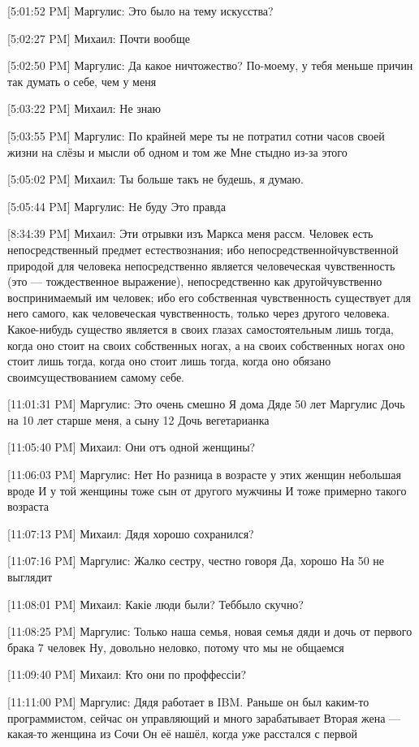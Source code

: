 \documentclass{article}
\newcommand{\yat}{{\fontencoding{X2}\selectfont\cyryat}} %
\begin{document}
[5:01:52 PM] Маргулис:
Это было на тему искусства?

[5:02:27 PM] Михаил:
Почти вообще

[5:02:50 PM] Маргулис:
Да какое ничтожество? По-моему, у тебя меньше причин так думать о себе, чем у меня

[5:03:22 PM] Михаил:
Не знаю

[5:03:55 PM] Маргулис:
По крайней мере ты не потратил сотни часов своей жизни на слёзы и мысли об одном и том же
 Мне стыдно из-за этого

[5:05:02 PM] Михаил:
Ты больше такъ не будешь, я думаю.

[5:05:44 PM] Маргулис:
Не буду
 Это правда

[8:34:39 PM] Михаил:
Эти отрывки изъ Маркса меня рассм.
 Человек есть непосредственный предмет естествознания; ибо непосредственнойчувственной природой для человека непосредственно является человеческая чувственность (это — тождественное выражение), непосредственно как другойчувственно воспринимаемый им человек; ибо его собственная чувственность существует для него самого, как человеческая чувственность, только через другого человека.
 Какое-нибудь существо является в своих глазах самостоятельным лишь тогда, когда оно стоит на своих собственных ногах, а на своих собственных ногах оно стоит лишь тогда, когда оно стоит лишь тогда, когда оно обязано своимсуществованием самому себе.

[11:01:31 PM] Маргулис:
Это очень смешно
 Я дома
 Дяде 50 лет
 Маргулис
 Дочь на 10 лет старше меня, а сыну 12
 Дочь вегетарианка

[11:05:40 PM] Михаил:
Они отъ одной женщины?

[11:06:03 PM] Маргулис:
Нет
 Но разница в возрасте у этих женщин небольшая вроде
 И у той женщины тоже сын от другого мужчины
 И тоже примерно такого возраста

[11:07:13 PM] Михаил:
Дядя хорошо сохранился?

[11:07:16 PM] Маргулис:
Жалко сестру, честно говоря
 Да, хорошо
 На 50 не выглядит

[11:08:01 PM] Михаил:
Какіе люди были? Теб\yat было скучно?

[11:08:25 PM] Маргулис:
Только наша семья, новая семья дяди и дочь от первого брака
 7 человек
 Ну, довольно неловко, потому что мы не общаемся

[11:09:40 PM] Михаил:
Кто они по проффессіи?

[11:11:00 PM] Маргулис:
Дядя работает в IBM. Раньше он был каким-то программистом, сейчас он управляющий и много зарабатывает
 Вторая жена — какая-то женщина из Сочи
 Он её нашёл, когда уже расстался с первой
\end{document}
